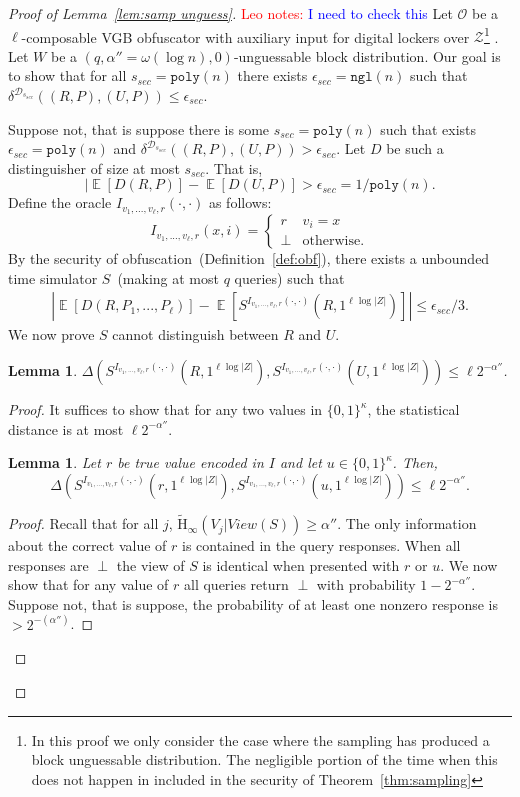 \documentclass[11pt]{article}
\newcommand{\thref}[1]{\mbox{Theorem~\ref{#1}}}
\newcommand{\defref}[1]{\mbox{Definition~\ref{#1}}}
\newcommand{\lemref}[1]{\mbox{Lemma~\ref{#1}}}
\DeclareMathOperator*{\expe}{\mathbb{E}}
\newcommand{\zo}{\ensuremath{\{0, 1\}}}
\newcommand{\poly}{\ensuremath{\mathtt{poly}}\xspace}
\newcommand{\ngl}{\ensuremath{\mathtt{ngl}}\xspace}
\newcommand{\Hav}{\tilde{\mathrm{H}}_\infty}
\newtheorem{lemma}[theorem]{Lemma}
\newcommand{\authnote}[2]{{\textcolor{red}{\textsf{#1 notes: }\textcolor{blue}{ #2}}\marginpar{\textcolor{red}{\textbf{!!!!!}}}}}
\newcommand{\authnote}[2]{}
\newcommand{\lnote}[1]{{\authnote{Leo}{#1}}}
\begin{document}
\begin{proof}[{\large Proof of \lemref{lem:samp unguess}}]

\lnote{I need to check this}
Let $\mathcal{O}$ be a $\ell$-composable VGB obfuscator with auxiliary input for digital lockers over $\mathcal{Z}$\footnote{In this proof we only consider the case where the sampling has produced a block unguessable distribution.  The negligible portion of the time when this does not happen in included in the security of \thref{thm:sampling}}  .  Let $W$ be a $(q, \alpha'' = \omega(\log n), 0)$-unguessable block distribution.  Our goal is to show that for all $s_{sec} = \poly(n)$ there exists $\epsilon_{sec} =\ngl(n)$ such that $\delta^{\mathcal{D}_{s_{sec}}}((R, P), (U, P))\le \epsilon_{sec}$.

Suppose not, that is suppose there is some $s_{sec} = \poly(n)$ such that exists $\epsilon_{sec} = \poly(n)$ and $\delta^{\mathcal{D}_{s_{sec}}}((R, P), (U, P))> \epsilon_{sec}$.
Let $D$ be such a distinguisher of size at most $s_{sec}$.  That is,
\[
| \expe[D(R, P)] - \expe[D(U, P)] > \epsilon_{sec} = 1/\poly(n).
\]
Define the oracle $I_{v_1, ..., v_\ell, r}(\cdot, \cdot)$ as follows:
\[I_{v_1,..., v_\ell, r}(x, i) =
\begin{cases}
r & v_i = x\\
\perp & \text{otherwise.}
\end{cases}\]  
By the security of obfuscation~(\defref{def:obf}), there exists a unbounded time simulator $S$~(making at most $q$ queries) such that
\begin{align}
\label{eq:dist before}
|\expe [D(R, P_1,..., P_\ell)] - \expe [S^{I_{v_1, ..., v_\ell, r}(\cdot, \cdot)}(R, 1^{\ell \log |Z|})] |\leq \epsilon_{sec}/3.
\end{align}
We now prove $S$ cannot distinguish between $R$ and $U$.
\begin{lemma}
\label{lem:sim cannot distinguish samp}
$\Delta(S^{I_{v_1, ..., v_\ell, r}(\cdot, \cdot)}(R, 1^{\ell \log |Z|}), S^{I_{v_1, ..., v_\ell, r}(\cdot, \cdot)}(U, 1^{\ell \log |Z|})) \le \ell 2^{-\alpha''}$.
\end{lemma}

\begin{proof}
\noindent It suffices to show that for any two values in $\zo^\kappa$, the statistical distance is at most $\ell 2^{-\alpha''}$.
\begin{lemma}
\label{lem:codewords in I close samp}
Let $r$ be true value encoded in $I$ and let $u\in \zo^\kappa$.  Then,
\[
\Delta( S^{I_{v_1, ..., v_\ell, r}(\cdot, \cdot)}(r, 1^{\ell \log |Z|}), S^{I_{v_1, ..., v_\ell, r}(\cdot, \cdot)}(u, 1^{\ell \log |Z|})) \le \ell 2^{-\alpha''}.
\]
\end{lemma}
\begin{proof}
Recall that for all $j$, $\Hav(V_j | View(S))\geq \alpha''$.  The only information about the correct value of $r$ is contained in the query responses.  When all responses are $\perp$ the view of $S$ is identical when presented with $r$ or $u$.  We now show that for any value of $r$ all queries return $\perp$ with probability $1-2^{-\alpha''}$.  Suppose not, that is suppose, the probability of at least one nonzero response is $> 2^{-(\alpha'')}$. 


\end{proof}
\end{proof}
\end{proof}
\end{document}
